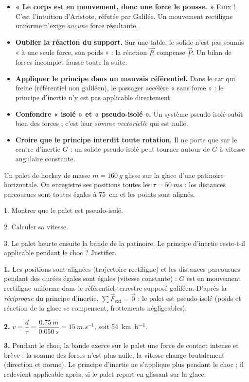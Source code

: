 \documentclass[11pt]{article}
\begin{document}
\begin{attention}
\begin{itemize}
\item \textbf{« Le corps est en mouvement, donc une force le pousse. »} Faux ! C'est l'intuition d'Aristote, réfutée par Galilée. Un mouvement rectiligne uniforme n'exige \emph{aucune} force résultante.
\item \textbf{Oublier la réaction du support.} Sur une table, le solide n'est pas soumis « à une seule force, son poids » : la réaction $\vec{R}$ compense $\vec{P}$. Un bilan de forces incomplet fausse toute la suite.
\item \textbf{Appliquer le principe dans un mauvais référentiel.} Dans le car qui freine (référentiel non galiléen), le passager accélère « sans force » : le principe d'inertie n'y est pas applicable directement.
\item \textbf{Confondre « isolé » et « pseudo-isolé ».} Un système pseudo-isolé subit bien des forces ; c'est leur \emph{somme vectorielle} qui est nulle.
\item \textbf{Croire que le principe interdit toute rotation.} Il ne porte que sur le centre d'inertie $G$ : un solide pseudo-isolé peut tourner autour de $G$ à vitesse angulaire constante.
\end{itemize}
\end{attention}

\begin{exercice}
Un palet de hockey de masse $m = \SI{160}{g}$ glisse sur la glace d'une patinoire horizontale. On enregistre ses positions toutes les $\tau = \SI{50}{ms}$ : les distances parcourues sont toutes égales à \SI{75}{cm} et les points sont alignés.\par
1. Montrer que le palet est pseudo-isolé.\par
2. Calculer sa vitesse.\par
3. Le palet heurte ensuite la bande de la patinoire. Le principe d'inertie reste-t-il applicable pendant le choc ? Justifier.
\end{exercice}

\begin{corrige}[Exercice 1]
\textbf{1.} Les positions sont alignées (trajectoire rectiligne) et les distances parcourues pendant des durées égales sont égales (vitesse constante) : $G$ est en mouvement rectiligne uniforme dans le référentiel terrestre supposé galiléen. D'après la \emph{réciproque} du principe d'inertie, $\sum \vec{F}_{\text{ext}} = \vec{0}$ : le palet est pseudo-isolé (poids et réaction de la glace se compensent, frottements négligeables).\par
\textbf{2.} $v = \dfrac{d}{\tau} = \dfrac{\SI{0,75}{m}}{\SI{0,050}{s}} = \SI{15}{m.s^{-1}}$, soit \SI{54}{km.h^{-1}}.\par
\textbf{3.} Pendant le choc, la bande exerce sur le palet une force de contact intense et brève : la somme des forces n'est plus nulle, la vitesse change brutalement (direction et norme). Le principe d'inertie ne s'applique plus pendant le choc ; il redevient applicable après, si le palet repart en glissant sur la glace.
\end{corrige}
\end{document}
